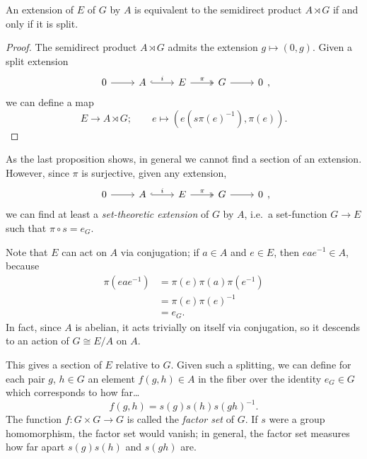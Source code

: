 \documentclass[main.tex]{subfiles}
\begin{document}
\begin{proposition}
  An extension of $E$ of $G$ by $A$ is equivalent to the semidirect product $A \rtimes G$ if and only if it is split.
\end{proposition}
\begin{proof}
  The semidirect product $A \rtimes G$ admits the extension $g \mapsto (0, g)$. Given a split extension
  \begin{equation*}
    \begin{tikzcd}
      0
      \arrow[r]
      & A
      \arrow[r, hook, "i"]
      & E
      \arrow[r, two heads, "\pi"]
      & G
      \arrow[r]
      & 0
    \end{tikzcd},
  \end{equation*}
  we can define a map
  \begin{equation*}
    E \to A \rtimes G;\qquad e \mapsto (e(s\pi(e)^{-1}), \pi(e)).
  \end{equation*}
\end{proof}

As the last proposition shows, in general we cannot find a section of an extension. However, since $\pi$ is surjective, given any extension,
\begin{equation*}
  \begin{tikzcd}
    0
    \arrow[r]
    & A
    \arrow[r, hook, "i"]
    & E
    \arrow[r, two heads, "\pi"]
    & G
    \arrow[r]
    & 0
  \end{tikzcd},
\end{equation*}
we can find at least a \emph{set-theoretic extension} of $G$ by $A$, i.e.\ a set-function $G \to E$ such that $\pi \circ s = e_{G}$.

Note that $E$ can act on $A$ via conjugation; if $a \in A$ and $e \in E$, then $eae^{-1} \in A$, because
\begin{align*}
  \pi(eae^{-1}) &=\pi(e)\pi(a)\pi(e^{-1}) \\
  &= \pi(e)\pi(e)^{-1} \\
  &= e_{G}.
\end{align*}
In fact, since $A$ is abelian, it acts trivially on itself via conjugation, so it descends to an action of $G \cong E/A$ on $A$.

This gives a section of $E$ relative to $G$. Given such a splitting, we can define for each pair $g$, $h \in G$ an element $f(g, h) \in A$ in the fiber over the identity $e_{G} \in G$ which corresponds to how far\dots
\begin{equation*}
  f(g, h) = s(g)s(h)s(gh)^{-1}.
\end{equation*}
The function $f\colon G \times G \to G$ is called the \emph{factor set} of $G$. If $s$ were a group homomorphism, the factor set would vanish; in general, the factor set measures how far apart $s(g)s(h)$ and $s(gh)$ are.
\end{document}
